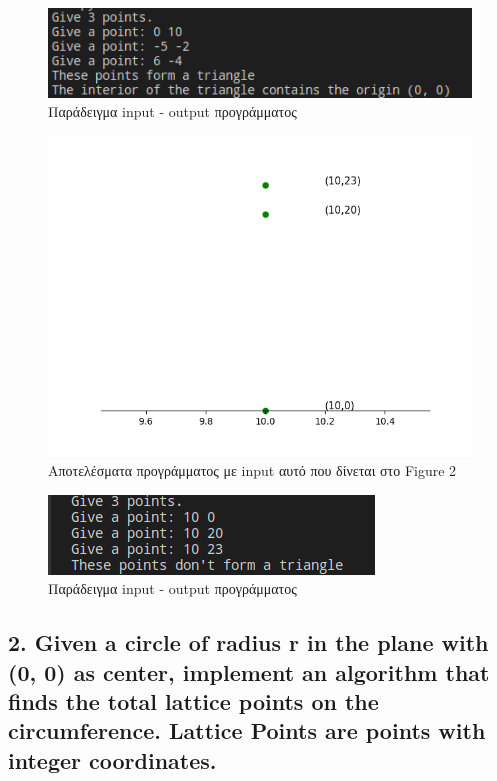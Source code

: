 \documentclass[12pt]{article}
\newenvironment{matlab}
	{\begin{figure}[hp]\centering\captionsetup{justification=centering}}
	{\end{figure}}
\begin{document}
\begin{matlab}	
	\includegraphics[scale=0.7]{images/exercise1_2.png}
	\caption{Παράδειγμα input - output προγράμματος}
\end{matlab}

\begin{matlab}
	\includegraphics[scale=0.8]{images/exercise1_3.png}
	\caption{Αποτελέσματα προγράμματος με input αυτό που δίνεται στο Figure 2}
\end{matlab}

\begin{matlab}
	\includegraphics[scale=0.7]{images/exercise1_4.png}
	\caption{Παράδειγμα input - output προγράμματος}
\end{matlab}





\vspace{2in}

\pagebreak

\subsection*{2. Given a circle of radius r in the plane with (0, 0) as center, implement an
    algorithm that finds the total lattice points on the circumference. Lattice Points are points
    with integer coordinates.}
\end{document}
